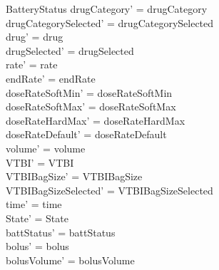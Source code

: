 \begin{schema}{BatteryStatus}
	drugCategory' = drugCategory\\ drugCategorySelected' = drugCategorySelected\\
	drug' = drug\\ 
	  \pagebreak
	drugSelected' = drugSelected\\
	rate' = rate\\
	endRate' = endRate\\
	doseRateSoftMin' = doseRateSoftMin\\
	doseRateSoftMax' = doseRateSoftMax\\
	doseRateHardMax' = doseRateHardMax\\
	doseRateDefault' = doseRateDefault\\
	volume' = volume\\
	VTBI' = VTBI\\
	VTBIBagSize' = VTBIBagSize\\ VTBIBagSizeSelected' = VTBIBagSizeSelected\\
	time' = time\\ State' = State\\
	battStatus' = battStatus\\
	bolus' = bolus\\
	bolusVolume' = bolusVolume\\

\end{schema}
